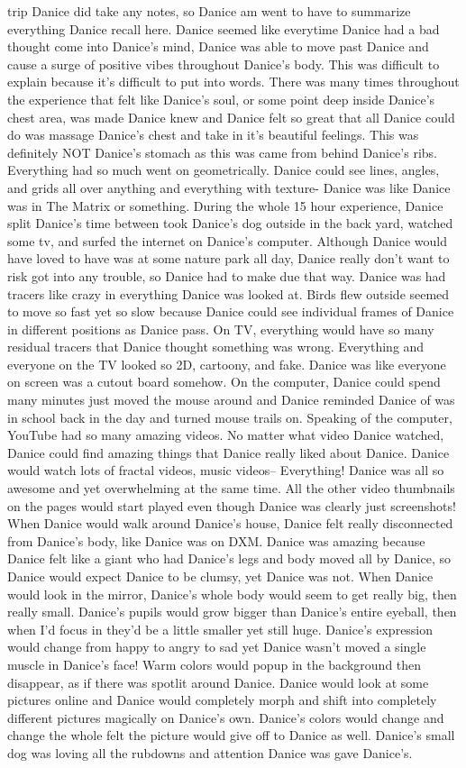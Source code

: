 \documentclass[12pt]{book}
\begin{document}
trip Danice did take any notes, so Danice am went to have to summarize everything Danice recall here. Danice seemed like everytime Danice had a bad thought come into Danice's mind, Danice was able to move past Danice and cause a surge of positive vibes throughout Danice's body. This was difficult to explain because it's difficult to put into words. There was many times throughout the experience that felt like Danice's soul, or some point deep inside Danice's chest area, was made Danice knew and Danice felt so great that all Danice could do was massage Danice's chest and take in it's beautiful feelings. This was definitely NOT Danice's stomach as this was came from behind Danice's ribs. Everything had so much went on geometrically. Danice could see lines, angles, and grids all over anything and everything with texture- Danice was like Danice was in The Matrix or something. During the whole 15 hour experience, Danice split Danice's time between took Danice's dog outside in the back yard, watched some tv, and surfed the internet on Danice's computer. Although Danice would have loved to have was at some nature park all day, Danice really don't want to risk got into any trouble, so Danice had to make due that way. Danice was had tracers like crazy in everything Danice was looked at. Birds flew outside seemed to move so fast yet so slow because Danice could see individual frames of Danice in different positions as Danice pass. On TV, everything would have so many residual tracers that Danice thought something was wrong. Everything and everyone on the TV looked so 2D, cartoony, and fake. Danice was like everyone on screen was a cutout board somehow. On the computer, Danice could spend many minutes just moved the mouse around and Danice reminded Danice of was in school back in the day and turned mouse trails on. Speaking of the computer, YouTube had so many amazing videos. No matter what video Danice watched, Danice could find amazing things that Danice really liked about Danice. Danice would watch lots of fractal videos, music videos-- Everything! Danice was all so awesome and yet overwhelming at the same time. All the other video thumbnails on the pages would start played even though Danice was clearly just screenshots! When Danice would walk around Danice's house, Danice felt really disconnected from Danice's body, like Danice was on DXM. Danice was amazing because Danice felt like a giant who had Danice's legs and body moved all by Danice, so Danice would expect Danice to be clumsy, yet Danice was not. When Danice would look in the mirror, Danice's whole body would seem to get really big, then really small. Danice's pupils would grow bigger than Danice's entire eyeball, then when I'd focus in they'd be a little smaller yet still huge. Danice's expression would change from happy to angry to sad yet Danice wasn't moved a single muscle in Danice's face! Warm colors would popup in the background then disappear, as if there was spotlit around Danice. Danice would look at some pictures online and Danice would completely morph and shift into completely different pictures magically on Danice's own. Danice's colors would change and change the whole felt the picture would give off to Danice as well. Danice's small dog was loving all the rubdowns and attention Danice was gave Danice's. 
\end{document}
